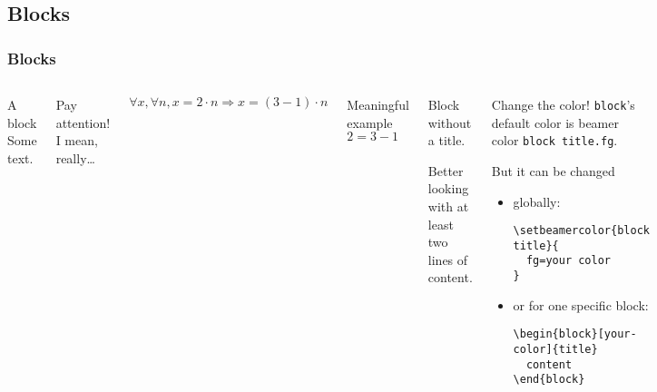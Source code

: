 \documentclass[aspectratio=169]{beamer}
\begin{document}
\subsection{Blocks}
\begin{frame}[fragile]
  \frametitle{Blocks}
  \begin{columns}
    \begin{block}{A block}
      Some text.
    \end{block}

    \begin{alertblock}{Pay attention!}
      I mean, really\dots
    \end{alertblock}

    \begin{theorem}
      $\forall x, \forall n, x = 2 \cdot n \Rightarrow x = (3 - 1) \cdot n$
    \end{theorem}

    \begin{exampleblock}{Meaningful example}
      $2 = 3 - 1$
    \end{exampleblock}

    \begin{block}{}
      Block without a title.

      Better looking with at least two lines of content.
    \end{block}

    \begin{block}[pink]{Change the color!}
      \texttt{block}'s default color is beamer color \texttt{block title.fg}.

      But it can be changed
      \begin{itemize}
      \item globally:
\begin{verbatim}
\setbeamercolor{block title}{
  fg=your color
}
\end{verbatim}
      \item or for one specific block:
\begin{verbatim}
\begin{block}[your-color]{title}
  content
\end{block}
\end{verbatim}
      \end{itemize}
    \end{block}

  \end{columns}
\end{frame}
\end{document}
